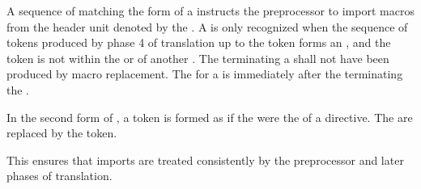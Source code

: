 \begin{bnf}
 \br
  \terminal{(    [    \{    <:    <\%}
\end{bnf}

\begin{bnf}
 \br
  \terminal{)    ]    \}    :>    \%>}
\end{bnf}

\pnum
A sequence of 
matching the form of a 
instructs the preprocessor to import macros
from the header unit
denoted by the .
A  is only recognized
when the sequence of tokens
produced by phase 4 of translation
up to the  token
forms an ,
and the  token is not within
the  or 
of another .
The \tcode{;} 
terminating a 
shall not have been produced by
macro replacement.
The  for a  is
immediately after the \tcode{;} terminating the .

\pnum
In the second form of ,
a  token is formed as if
the 
were the  of a  directive.
The  are replaced by
the  token.
\begin{note}
This ensures that imports are treated consistently by
the preprocessor and later phases of translation.
\end{note}

